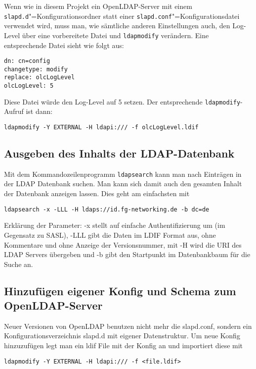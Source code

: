 Wenn wie in diesem Projekt ein OpenLDAP-Server mit einem \texttt{slapd.d}"=Konfigurationsordner statt einer \texttt{slapd.conf}"=Konfigurationsdatei verwendet wird, muss man, wie sämtliche anderen Einstellungen auch, den Log-Level über eine vorbereitete Datei und \texttt{ldapmodify} verändern. Eine entsprechende Datei sieht wie folgt aus:
\begin{lstlisting}
dn: cn=config
changetype: modify
replace: olcLogLevel
olcLogLevel: 5
\end{lstlisting}
Diese Datei würde den Log-Level auf 5 setzen. Der entsprechende \texttt{ldapmodify}-Aufruf ist dann:
\begin{lstlisting}
ldapmodify -Y EXTERNAL -H ldapi:/// -f olcLogLevel.ldif
\end{lstlisting}


\subsection{Ausgeben des Inhalts der LDAP-Datenbank}
Mit dem Kommandozeilenprogramm \texttt{ldapsearch} kann man nach Einträgen in der LDAP Datenbank suchen. Man kann sich damit auch den gesamten Inhalt der Datenbank anzeigen lassen. Dies geht am einfachsten mit
\begin{lstlisting}
ldapsearch -x -LLL -H ldaps://id.fg-networking.de -b dc=de
\end{lstlisting}
Erklärung der Parameter: -x stellt auf einfache Authentifizierung um (im Gegensatz zu SASL), -LLL gibt die Daten im LDIF Format aus, ohne Kommentare und ohne Anzeige der Versionsnummer, mit -H wird die URI des LDAP Servers übergeben und -b gibt den Startpunkt im Datenbankbaum für die Suche an.


\subsection{Hinzufügen eigener Konfig und Schema zum OpenLDAP-Server}
Neuer Versionen von OpenLDAP benutzen nicht mehr die slapd.conf, sondern ein Konfigurationsverzeichnis slapd.d mit eigener Datenstruktur.
Um neue Konfig hinzuzufügen legt man ein ldif File mit der Konfig an und importiert diese mit
\begin{lstlisting}
ldapmodify -Y EXTERNAL -H ldapi:/// -f <file.ldif> 
\end{lstlisting}

